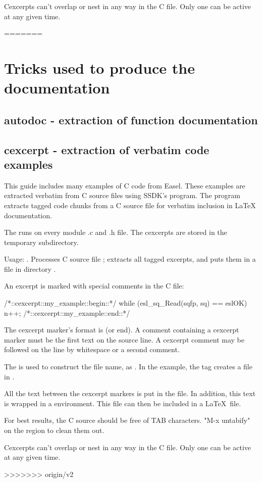 Cexcerpts can't overlap or nest in any way in the C file. Only one can
be active at any given time.


=======
\section{Tricks used to produce the documentation}

\subsection{autodoc - extraction of function documentation}


\subsection{cexcerpt - extraction of verbatim code examples}

This guide includes many examples of C code from Easel. These examples
are extracted verbatim from C source files using SSDK's
 program. The  program extracts tagged
code chunks from a C source file for verbatim inclusion in LaTeX
documentation.

The  runs  on every
module .c and .h file. The cexcerpts are stored in the temporary
 subdirectory.

Usage: . Processes C source file
; extracts all tagged excerpts, and puts them in a file
in directory .

An excerpt is marked with special comments in the C file:
\begin{cchunk}
/*::cexcerpt::my_example::begin::*/
   while (esl_sq_Read(sqfp, sq) == eslOK)
     { n++; }
/*::cexcerpt::my_example::end::*/
\end{cchunk}

The cexcerpt marker's format is  (or
end). A comment containing a cexcerpt marker must be the first text on
the source line. A cexcerpt comment may be followed on the line by
whitespace or a second comment.

The  is used to construct the file name, as
.  In the example, the tag  creates
a file  in .

All the text between the cexcerpt markers is put in the file.  In
addition, this text is wrapped in a  environment.  This
file can then be included in a \LaTeX\ file.

For best results, the C source should be free of TAB characters.
"M-x untabify" on the region to clean them out.

Cexcerpts can't overlap or nest in any way in the C file. Only one can
be active at any given time.


>>>>>>> origin/v2
